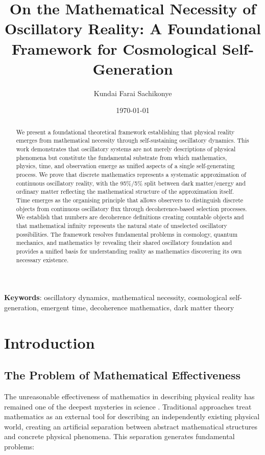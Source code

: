 \documentclass[11pt]{article}
\title{On the Mathematical Necessity of Oscillatory Reality: A Foundational Framework for Cosmological Self-Generation}
\author{Kundai Farai Sachikonye}
\date{\today}
\theoremstyle{remark}
\begin{document}
\maketitle

\begin{abstract}
We present a foundational theoretical framework establishing that physical reality emerges from mathematical necessity through self-sustaining oscillatory dynamics. This work demonstrates that oscillatory systems are not merely descriptions of physical phenomena but constitute the fundamental substrate from which mathematics, physics, time, and observation emerge as unified aspects of a single self-generating process. We prove that discrete mathematics represents a systematic approximation of continuous oscillatory reality, with the 95\%/5\% split between dark matter/energy and ordinary matter reflecting the mathematical structure of the approximation itself. Time emerges as the organising principle that allows observers to distinguish discrete objects from continuous oscillatory flux through decoherence-based selection processes. We establish that numbers are decoherence definitions creating countable objects and that mathematical infinity represents the natural state of unselected oscillatory possibilities. The framework resolves fundamental problems in cosmology, quantum mechanics, and mathematics by revealing their shared oscillatory foundation and provides a unified basis for understanding reality as mathematics discovering its own necessary existence.
\end{abstract}

\textbf{Keywords}: oscillatory dynamics, mathematical necessity, cosmological self-generation, emergent time, decoherence mathematics, dark matter theory

\section{Introduction}

\subsection{The Problem of Mathematical Effectiveness}

The unreasonable effectiveness of mathematics in describing physical reality has remained one of the deepest mysteries in science \cite{wigner1960unreasonable}. Traditional approaches treat mathematics as an external tool for describing an independently existing physical world, creating an artificial separation between abstract mathematical structures and concrete physical phenomena. This separation generates fundamental problems:
\end{document}
